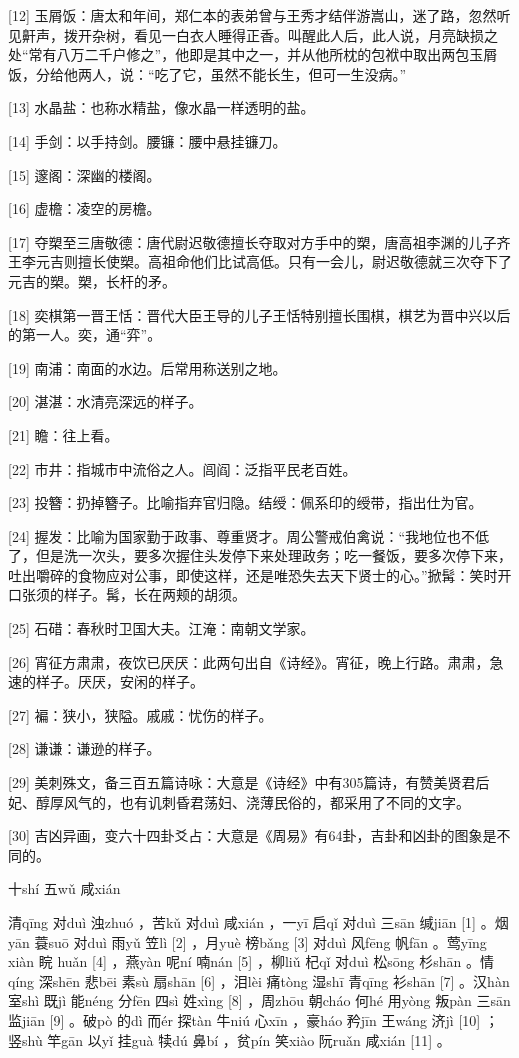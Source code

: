 \documentclass[12pt,UTF8]{ctexbook}
\begin{document}
[12] 玉屑饭：唐太和年间，郑仁本的表弟曾与王秀才结伴游嵩山，迷了路，忽然听见鼾声，拨开杂树，看见一白衣人睡得正香。叫醒此人后，此人说，月亮缺损之处“常有八万二千户修之”，他即是其中之一，并从他所枕的包袱中取出两包玉屑饭，分给他两人，说：“吃了它，虽然不能长生，但可一生没病。”

[13] 水晶盐：也称水精盐，像水晶一样透明的盐。

[14] 手剑：以手持剑。腰镰：腰中悬挂镰刀。

[15] 邃阁：深幽的楼阁。

[16] 虚檐：凌空的房檐。

[17] 夺槊至三唐敬德：唐代尉迟敬德擅长夺取对方手中的槊，唐高祖李渊的儿子齐王李元吉则擅长使槊。高祖命他们比试高低。只有一会儿，尉迟敬德就三次夺下了元吉的槊。槊，长杆的矛。

[18] 奕棋第一晋王恬：晋代大臣王导的儿子王恬特别擅长围棋，棋艺为晋中兴以后的第一人。奕，通“弈”。

[19] 南浦：南面的水边。后常用称送别之地。

[20] 湛湛：水清亮深远的样子。

[21] 瞻：往上看。

[22] 市井：指城市中流俗之人。闾阎：泛指平民老百姓。

[23] 投簪：扔掉簪子。比喻指弃官归隐。结绶：佩系印的绶带，指出仕为官。

[24] 握发：比喻为国家勤于政事、尊重贤才。周公警戒伯禽说：“我地位也不低了，但是洗一次头，要多次握住头发停下来处理政务；吃一餐饭，要多次停下来，吐出嚼碎的食物应对公事，即使这样，还是唯恐失去天下贤士的心。”掀髯：笑时开口张须的样子。髯，长在两颊的胡须。

[25] 石碏：春秋时卫国大夫。江淹：南朝文学家。

[26] 宵征方肃肃，夜饮已厌厌：此两句出自《诗经》。宵征，晚上行路。肃肃，急速的样子。厌厌，安闲的样子。

[27] 褊：狭小，狭隘。戚戚：忧伤的样子。

[28] 谦谦：谦逊的样子。

[29] 美刺殊文，备三百五篇诗咏：大意是《诗经》中有305篇诗，有赞美贤君后妃、醇厚风气的，也有讥刺昏君荡妇、浇薄民俗的，都采用了不同的文字。

[30] 吉凶异画，变六十四卦爻占：大意是《周易》有64卦，吉卦和凶卦的图象是不同的。





十shí 五wǔ 咸xián


清qīng 对duì 浊zhuó ，苦kǔ 对duì 咸xián ，一yī 启qǐ 对duì 三sān 缄jiān [1] 。烟yān 蓑suō 对duì 雨yǔ 笠lì [2] ，月yuè 榜bǎng [3] 对duì 风fēng 帆fān 。莺yīng xiàn 睆 huǎn [4] ，燕yàn 呢ní 喃nán [5] ，柳liǔ 杞qǐ 对duì 松sōng 杉shān 。情qíng 深shēn 悲bēi 素sù 扇shān [6] ，泪lèi 痛tòng 湿shī 青qīng 衫shān [7] 。汉hàn 室shì 既jì 能néng 分fēn 四sì 姓xìng [8] ，周zhōu 朝cháo 何hé 用yòng 叛pàn 三sān 监jiān [9] 。破pò 的dì 而ér 探tàn 牛niú 心xīn ，豪háo 矜jīn 王wáng 济jì [10] ；竖shù 竿gān 以yǐ 挂guà 犊dú 鼻bí ，贫pín 笑xiào 阮ruǎn 咸xián [11] 。
\end{document}
